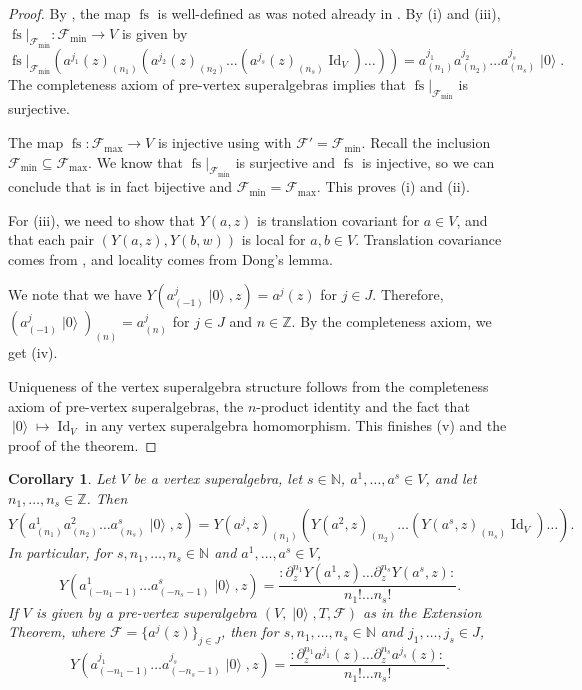 \documentclass[a4paper, 12pt, reqno]{amsart}
\newtheorem{corollary}[theorem]{Corollary}
\theoremstyle{remark}
\DeclareMathOperator{\Id}{Id}
\DeclareMathOperator{\vac}{|0\rangle}
\DeclareMathOperator{\fs}{fs}
\begin{document}
\begin{proof}
  By , the map $\fs$ is well-defined as was noted already in .
  By (i) and (iii), $\fs|_{\mathcal{F}_{\min}}: \mathcal{F}_{\min} \to V$ is given by
  \begin{equation*}
    \fs|_{\mathcal{F}_{\min}}(a^{j_1}(z)_{(n_1)}(a^{j_2}(z)_{(n_2)}\dots(a^{j_s}(z)_{(n_s)}\Id_V)\dots)) = a^{j_1}_{(n_1)}a^{j_2}_{(n_2)}\dots a^{j_s}_{(n_s)}\vac.
  \end{equation*}
  The completeness axiom of pre-vertex superalgebras implies that $\fs|_{\mathcal{F}_{\min}}$ is surjective.

  The map $\fs: \mathcal{F}_{\max} \to V$ is injective using  with $\mathcal{F}' = \mathcal{F}_{\min}$.
  Recall the inclusion $\mathcal{F}_{\min} \subseteq \mathcal{F}_{\max}$.
  We know that $\fs|_{\mathcal{F}_{\min}}$ is surjective and $\fs$ is injective, so we can conclude that is in fact bijective and $\mathcal{F}_{\min} = \mathcal{F}_{\max}$.
  This proves (i) and (ii).

  For (iii), we need to show that $Y(a, z)$ is translation covariant for $a \in V$, and that each pair $(Y(a, z), Y(b, w))$ is local for $a, b \in V$.
  Translation covariance comes from , and locality comes from Dong's lemma.

  We note that we have $Y(a^j_{(-1)}\vac, z) = a^j(z)$ for $j \in J$.
  Therefore, $(a^j_{(-1)}\vac)_{(n)} = a^j_{(n)}$ for $j \in J$ and $n \in \mathbb{Z}$.
  By the completeness axiom, we get (iv).

  Uniqueness of the vertex superalgebra structure follows from the completeness axiom of pre-vertex superalgebras, the $n$-product identity and the fact that $\vac \mapsto \Id_V$ in any vertex superalgebra homomorphism.
  This finishes (v) and the proof of the theorem.
\end{proof}

\begin{corollary}
  \label{crl:1}
  Let $V$ be a vertex superalgebra, let $s \in \mathbb{N}$, $a^1, \dots, a^s \in V$, and let $n_1, \dots, n_s \in \mathbb{Z}$.
  Then
  \begin{equation*}
    Y(a^1_{(n_1)}a^2_{(n_2)}\dots a^s_{(n_s)}\vac, z) = Y(a^j, z)_{(n_1)}(Y(a^2, z)_{(n_2)}\dots(Y(a^s, z)_{(n_s)}\Id_V)\dots).
  \end{equation*}
  In particular, for $s, n_1, \dots, n_s \in \mathbb{N}$ and $a^1, \dots, a^s \in V$,
  \begin{equation*}
    Y(a^1_{(-n_1 - 1)}\dots a^s_{(-n_s - 1)}\vac, z) = \frac{:\partial^{n_1}_zY(a^1, z)\dots\partial^{n_s}_zY(a^s, z):}{n_1!\dots n_s!}.
  \end{equation*}
  If $V$ is given by a pre-vertex superalgebra $(V, \vac, T, \mathcal{F})$ as in the Extension Theorem, where $\mathcal{F} = \{a^j(z)\}_{j \in J}$, then for $s, n_1, \dots, n_s \in \mathbb{N}$ and $j_1, \dots, j_s \in J$,
  \begin{equation*}
    Y(a^{j_1}_{(-n_1 - 1)}\dots a^{j_s}_{(-n_s - 1)}\vac, z) = \frac{:\partial^{n_1}_za^{j_1}(z)\dots\partial^{n_s}_za^{j_s}(z):}{n_1!\dots n_s!}.
  \end{equation*}
\end{corollary}
\end{document}
